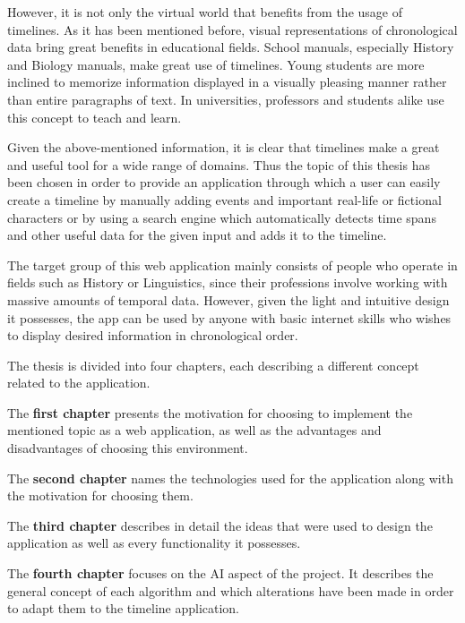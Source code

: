 \documentclass{report}
\begin{document}
However, it is not only the virtual world that benefits from the usage of timelines. As it has been mentioned before, visual representations of chronological data bring great benefits in educational fields. School manuals, especially History and Biology manuals, make great use of timelines. Young students are more inclined to memorize information displayed in a visually pleasing manner rather than entire paragraphs of text. In universities, professors and students alike use this concept to teach and learn. \par

Given the above-mentioned information, it is clear that timelines make a great and useful tool for a wide range of domains. Thus the topic of this thesis has been chosen in order to provide an application through which a user can easily create a timeline by manually adding events and important real-life or fictional characters or by using a search engine which automatically detects time spans and other useful data for the given input and adds it to the timeline. \par

The target group of this web application mainly consists of people who operate in fields such as History or Linguistics, since their professions involve working with massive amounts of temporal data. However, given the light and intuitive design it possesses, the app can be used by anyone with basic internet skills who wishes to display desired information in chronological order. \par

The thesis is divided into four chapters, each describing a different concept related to the application. \par

The \textbf{first chapter} presents the motivation for choosing to implement the mentioned topic as a web application, as well as the advantages and disadvantages of choosing this environment. \par

The \textbf{second chapter} names the technologies used for the application along with the motivation for choosing them. \par

The \textbf{third chapter} describes in detail the ideas that were used to design the application as well as every functionality it possesses. \par

The \textbf{fourth chapter} focuses on the AI aspect of the project. It describes the general concept of each algorithm and which alterations have been made in order to adapt them to the timeline application. \par
\end{document}
